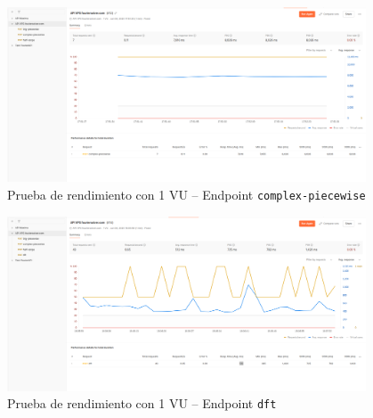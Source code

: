 \begin{figure}[H]
	\centering
	\includegraphics[width=0.95\textwidth]{img/chapter07/test-1user-complex.png}
	\caption{Prueba de rendimiento con 1 VU – Endpoint \texttt{complex-piecewise}}
	\label{fig:test-1user-complex}
\end{figure}

\begin{figure}[H]
	\centering
	\includegraphics[width=0.95\textwidth]{img/chapter07/test-1user-dft.png}
	\caption{Prueba de rendimiento con 1 VU – Endpoint \texttt{dft}}
	\label{fig:test-1user-dft}
\end{figure}


